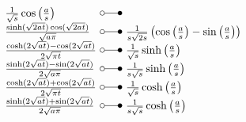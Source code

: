 \begin{footnotesize}
\[\begin{array}{@{}l@{ ~ \laplace ~ }l@{}}
    \frac{1}{\sqrt{s}} \cos\left(\frac{a}{s}\right) \\
\frac{\sinh(\sqrt{2 at}) \cos(\sqrt{2 at})}{\sqrt{a \pi}} &
    \frac{1}{s \sqrt{2 s}} \left(\cos\left(\frac{a}{s}\right) - \sin\left(\frac{a}{s}\right)\right) \\
\frac{\cosh(2 \sqrt{at}) - \cos(2 \sqrt{at})}{2 \sqrt{\pi t}} &
    \frac{1}{\sqrt{s}} \sinh\left(\frac{a}{s}\right) \\
\frac{\sinh(2 \sqrt{at}) - \sin(2 \sqrt{at})}{2 \sqrt{a \pi}} &
    \frac{1}{s \sqrt{s}} \sinh\left(\frac{a}{s}\right) \\
\frac{\cosh(2 \sqrt{at}) + \cos(2 \sqrt{at})}{2 \sqrt{\pi t}} &
    \frac{1}{\sqrt{s}} \cosh\left(\frac{a}{s}\right) \\
\frac{\sinh(2 \sqrt{at}) + \sin(2 \sqrt{at})}{2 \sqrt{a \pi}} &
    \frac{1}{s \sqrt{s}} \cosh\left(\frac{a}{s}\right) \\
\end{array} \]


\end{footnotesize}
